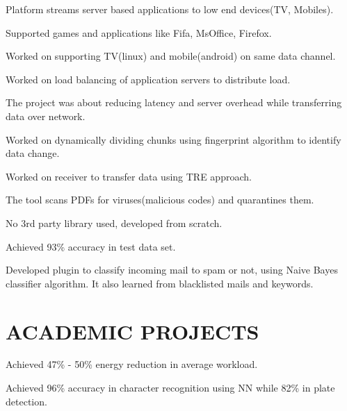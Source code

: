\documentclass[]{deedy-resume-openfont}
\begin{document}
\begin{minipage}[t]{0.65\textwidth}
\location{}
\begin{tightemize}
\item Platform streams server based applications to low end devices(TV, Mobiles).
\item Supported games and applications like Fifa, MsOffice, Firefox.
\item Worked on supporting TV(linux) and mobile(android) on same data channel.
\item Worked on load balancing of application servers to distribute load.
\end{tightemize}
\sectionsep

\location{}
\begin{tightemize}
\item The project was about reducing latency and server overhead while transferring data over network.
\item Worked on dynamically dividing chunks using fingerprint algorithm to identify data change.
\item Worked on receiver to transfer data using TRE approach.
\end{tightemize}
\sectionsep

\location{}
\begin{tightemize}
\item The tool scans PDFs for viruses(malicious codes) and quarantines them.
\item No 3rd party library used, developed from scratch.
\item Achieved 93\% accuracy in test data set.
\end{tightemize}
\sectionsep

\location{}
\begin{tightemize}
\item Developed plugin to classify incoming mail to spam or not, using Naive Bayes classifier algorithm.  It also learned from blacklisted mails and keywords.
\end{tightemize}
\sectionsep

\section{ACADEMIC PROJECTS}
\location{}
\begin{tightemize}
\item Achieved 47\% - 50\% energy reduction in average workload.  
\end{tightemize}
\sectionsep

\begin{tightemize}
\item Achieved 96\% accuracy in character recognition using NN while 82\% in plate detection.
\end{tightemize}
\sectionsep


\end{minipage} 
\end{document}
